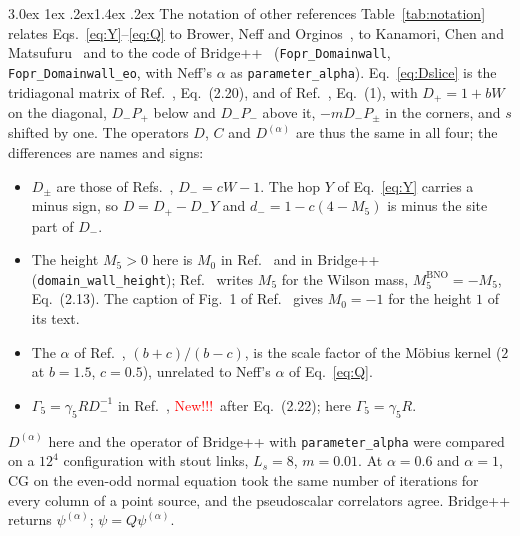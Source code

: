 \documentclass[11pt,a4paper]{article}
\makeatletter
\newif\ifshownew \shownewtrue
\DeclareRobustCommand\New{\ifshownew\textcolor{red}{New!!!}\ \else\ignorespaces\fi}
\renewcommand\section{\@startsection{section}{1}{\z@}%
  {3.0ex \@plus 1ex \@minus .2ex}{1.4ex \@plus .2ex}%
  {\centering\normalfont\normalsize\bfseries}}
\newcommand\FloatBarrier{\par\begingroup\let\@elt\relax
  \edef\@tempa{\@botlist\@deferlist\@dbldeferlist}%
  \ifx\@tempa\@empty\else\clearpage\fi\endgroup}
\let\origsection\section
\renewcommand\section{\FloatBarrier\origsection}
\numberwithin{equation}{section}
\newcommand{\Pp}{P_{+}}
\newcommand{\Pm}{P_{-}}
\newcommand{\Gfive}{\Gamma_5}
\makeatother
\begin{document}
\section{The notation of other references}
\label{sec:notation}
Table~\ref{tab:notation} relates Eqs.~\eqref{eq:Y}--\eqref{eq:Q} to Brower, Neff
and Orginos~\cite{BNO}, to Kanamori, Chen and Matsufuru~\cite{KCM2024} and to the
code of Bridge++~\cite{Bridge} (\texttt{Fopr\_Domainwall}, \texttt{Fopr\_Domainwall\_eo},
with Neff's $\alpha$ as \texttt{parameter\_alpha}). Eq.~\eqref{eq:Dslice} is the
tridiagonal matrix of Ref.~\cite{BNO}, Eq.~(2.20), and of Ref.~\cite{KCM2024}, Eq.~(1), with
$D_+=1+bW$ on the diagonal, $D_-\Pp$ below and $D_-\Pm$ above it, $-mD_-P_\pm$ in the corners,
and $s$ shifted by one. The operators $D$, $C$ and $D^{(\alpha)}$ are thus the same in all four;
the differences are names and signs:
\begin{itemize}
\item $D_\pm$ are those of Refs.~\cite{BNO,KCM2024}, $D_-=cW-1$. The hop $Y$ of
Eq.~\eqref{eq:Y} carries a minus sign, so $D=D_+-D_-Y$ and $d_-=1-c(4-M_5)$ is minus the
site part of $D_-$.
\item The height $M_5>0$ here is $M_0$ in Ref.~\cite{KCM2024} and in Bridge++
(\texttt{domain\_wall\_height}); Ref.~\cite{BNO} writes $M_5$ for the Wilson mass,
$M_5^{\mathrm{BNO}}=-M_5$, Eq.~(2.13). The caption of Fig.~1 of Ref.~\cite{KCM2024}
gives $M_0=-1$ for the height $1$ of its text.
\item The $\alpha$ of Ref.~\cite{BNO}, $(b+c)/(b-c)$, is the scale factor of the
M\"obius kernel ($2$ at $b=1.5$, $c=0.5$), unrelated to Neff's $\alpha$ of Eq.~\eqref{eq:Q}.
\item $\Gamma_5=\gamma_5RD_-^{-1}$ in Ref.~\cite{BNO}, \New after Eq.~(2.22); here $\Gfive=\gamma_5R$.
\end{itemize}
$D^{(\alpha)}$ here and the operator of Bridge++ with \texttt{parameter\_alpha} were
compared on a $12^4$ configuration with stout links, $L_s=8$, $m=0.01$. At $\alpha=0.6$
and $\alpha=1$, CG on the even-odd normal equation took the same number of iterations
for every column of a point source, and the pseudoscalar correlators agree. Bridge++ returns $\psi^{(\alpha)}$; $\psi=Q\psi^{(\alpha)}$.
\end{document}
